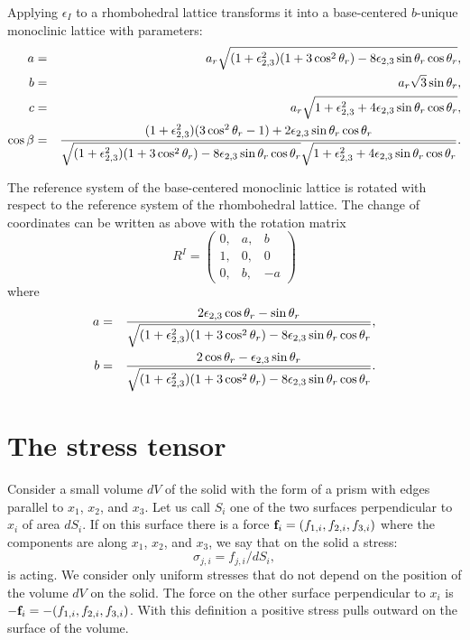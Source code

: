 \documentclass[12pt,a4paper,twoside]{report}
\begin{document}
Applying $\epsilon_I$ to a rhombohedral lattice transforms it into a
base-centered $b$-unique monoclinic lattice with parameters:
\begin{eqnarray}
a&=&a_r \sqrt{(1+\epsilon_{2,3}^2)(1 + 3 \cos^2 \theta_r)-
8\epsilon_{2,3}\sin \theta_r\cos \theta_r}, \\
b&=&a_r \sqrt{3}\sin \theta_r, \\
c&=&a_r \sqrt{1+\epsilon_{2,3}^2+4\epsilon_{2,3}\sin \theta_r\cos \theta_r}, \\
\cos\beta &=& {(1+\epsilon_{2,3}^2) (3 \cos^2 \theta_r-1) 
+ 2 \epsilon_{2,3} \sin \theta_r\cos \theta_r
\over \sqrt{(1+\epsilon_{2,3}^2)(1 + 3 \cos^2 \theta_r)-
8\epsilon_{2,3}\sin \theta_r\cos \theta_r} \sqrt{1+\epsilon_{2,3}^2+4\epsilon_{2,3}\sin \theta_r\cos \theta_r}}.
\end{eqnarray}

The reference system of the base-centered monoclinic lattice is rotated 
with respect to the reference system of the rhombohedral lattice.
The change of coordinates can be written as above with the rotation matrix 
\begin{equation}
R^I=\left( \begin{array}{ccc}
0, & a, &  b\\
1, & 0, & 0  
\\
0, & b, & -a 
\end{array}
\right)
\end{equation}
where
\begin{eqnarray}
a&=& {2 \epsilon_{2,3} \cos \theta_r - \sin \theta_r \over 
\sqrt{(1+\epsilon_{2,3}^2)(1 + 3 \cos^2 \theta_r)-
8\epsilon_{2,3}\sin \theta_r\cos \theta_r}}, \\
b&=& {2 \cos \theta_r - \epsilon_{2,3} \sin \theta_r \over 
\sqrt{(1+\epsilon_{2,3}^2)(1 + 3 \cos^2 \theta_r)-
8\epsilon_{2,3}\sin \theta_r\cos \theta_r}}.
\end{eqnarray}

\newpage
{\color{dark-blue}\chapter{The stress tensor}}
\color{black}

Consider a small volume $dV$ of the solid with the form of a prism with 
edges parallel to $x_1$, $x_2$, and $x_3$. Let us call $S_i$ one of
the two surfaces perpendicular to $x_i$ of area $dS_i$. If on this surface 
there is a force ${\bf f}_i=(f_{1,i}, f_{2,i}, f_{3,i})$ where the components
are along $x_1$, $x_2$, and $x_3$, we say that on the solid a
stress: 
\begin{equation}
\sigma_{j,i}=f_{j,i} / dS_i, 
\end{equation}
is acting.
We consider only uniform stresses
that do not depend on the position of the volume $dV$ on the solid.
The force on the other surface perpendicular to $x_i$ is 
$-{\bf f}_i=-(f_{1,i}, f_{2,i}, f_{3,i})$. With this definition a positive
stress pulls outward on the surface of the volume.
\end{document}
